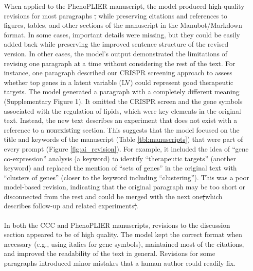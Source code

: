 \documentclass[
]{article}
\providecommand{\DIFaddtex}[1]{{\protect\color{blue}\uwave{#1}}} %
\providecommand{\DIFdeltex}[1]{{\protect\color{red}\sout{#1}}}                      %
\providecommand{\DIFaddbegin}{} %
\providecommand{\DIFaddend}{} %
\providecommand{\DIFdelbegin}{} %
\providecommand{\DIFdelend}{} %
\providecommand{\DIFadd}[1]{\texorpdfstring{\DIFaddtex{#1}}{#1}} %
\providecommand{\DIFdel}[1]{\texorpdfstring{\DIFdeltex{#1}}{}} %
\newcommand{\DIFscaledelfig}{0.5}
\newlength{\DIFdelgraphicswidth} %
\newlength{\DIFdelgraphicsheight} %
\newcommand{\DIFaddincludegraphics}[2][]{{\color{blue}\fbox{\DIFOincludegraphics[#1]{#2}}}} %
\newcommand{\DIFdelincludegraphics}[2][]{%
\sbox{\DIFdelgraphicsbox}{\DIFOincludegraphics[#1]{#2}}%
\settoboxwidth{\DIFdelgraphicswidth}{\DIFdelgraphicsbox} %
\settoboxtotalheight{\DIFdelgraphicsheight}{\DIFdelgraphicsbox} %
\scalebox{\DIFscaledelfig}{%
\parbox[b]{\DIFdelgraphicswidth}{\usebox{\DIFdelgraphicsbox}\\[-\baselineskip] \rule{\DIFdelgraphicswidth}{0em}}\llap{\resizebox{\DIFdelgraphicswidth}{\DIFdelgraphicsheight}{%
\setlength{\unitlength}{\DIFdelgraphicswidth}%
\begin{picture}(1,1)%
\thicklines\linethickness{2pt} %
{\color[rgb]{1,0,0}\put(0,0){\framebox(1,1){}}}%
{\color[rgb]{1,0,0}\put(0,0){\line( 1,1){1}}}%
{\color[rgb]{1,0,0}\put(0,1){\line(1,-1){1}}}%
\end{picture}%
}\hspace*{3pt}}} %
} %
\DeclareRobustCommand{\DIFaddbegin}{\DIFOaddbegin \let\includegraphics\DIFaddincludegraphics} %
\DeclareRobustCommand{\DIFaddend}{\DIFOaddend \let\includegraphics\DIFOincludegraphics} %
\DeclareRobustCommand{\DIFdelbegin}{\DIFOdelbegin \let\includegraphics\DIFdelincludegraphics} %
\DeclareRobustCommand{\DIFdelend}{\DIFOaddend \let\includegraphics\DIFOincludegraphics} %
\begin{document}
When applied to the PhenoPLIER manuscript, the model produced high-quality revisions for most paragraphs \DIFdelbegin \DIFdel{, }\DIFdelend while preserving citations and references to figures, tables, and other sections of the manuscript in the Manubot/Markdown format.
In some cases, important details were missing, but they could be easily added back while preserving the improved sentence structure of the revised version.
In other cases, the model's output demonstrated the limitations of revising one paragraph at a time without considering the rest of the text.
For instance, one paragraph described our CRISPR screening approach to assess whether top genes in a latent variable (LV) could represent good therapeutic targets.
The model generated a paragraph with a completely different meaning (Supplementary Figure 1).
It omitted the CRISPR screen and the gene symbols associated with the regulation of lipids, which were key elements in the original text.
Instead, the new text describes an experiment that does not exist with a reference to a \DIFdelbegin \DIFdel{nonexisting }\DIFdelend \DIFaddbegin \DIFadd{non-existent }\DIFaddend section.
This suggests that the model focused on the title and keywords of the manuscript (Table \ref{tbl:manuscripts}) that were part of every prompt (Figure \ref{fig:ai_revision}).
For example, it included the idea of ``gene co-expression'' analysis (a keyword) to identify ``therapeutic targets'' (another keyword) and replaced the mention of ``sets of genes'' in the original text with ``clusters of genes'' (closer to the keyword including ``clustering'').
This was a poor model-based revision, indicating that the original paragraph may be too short or disconnected from the rest and could be merged with the next one\DIFdelbegin \DIFdel{(}\DIFdelend \DIFaddbegin \DIFadd{, }\DIFaddend which describes follow-up and related experiments\DIFdelbegin \DIFdel{)}\DIFdelend .

\DIFdelbegin %
\DIFdelend \DIFaddbegin \paragraph{\DIFadd{Discussion}}
\DIFaddend 

In both the CCC and PhenoPLIER manuscripts, revisions to the discussion section appeared to be of high quality.
The model kept the correct format when necessary (e.g., using italics for gene symbols), maintained most of the citations, and improved the readability of the text in general.
Revisions for some paragraphs introduced minor mistakes that a human author could readily fix.
\end{document}
